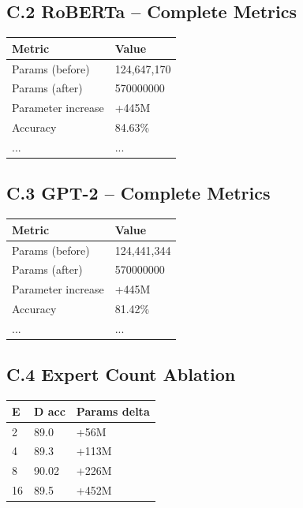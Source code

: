 \subsection{C.2 RoBERTa -- Complete Metrics}

\begin{table}[H]
\centering
\small
\begin{tabular}{ll}
\toprule
\textbf{Metric} & \textbf{Value} \\
\midrule
Params (before) & 124,647,170 \\
Params (after) & 570000000 \\
Parameter increase & +445M \\
Accuracy & 84.63\% \\
... & ... \\
\bottomrule
\end{tabular}
\end{table}

\subsection{C.3 GPT-2 -- Complete Metrics}

\begin{table}[H]
\centering
\small
\begin{tabular}{ll}
\toprule
\textbf{Metric} & \textbf{Value} \\
\midrule
Params (before) & 124,441,344 \\
Params (after) & 570000000 \\
Parameter increase & +445M \\
Accuracy & 81.42\% \\
... & ... \\
\bottomrule
\end{tabular}
\end{table}

\subsection{C.4 Expert Count Ablation}

\begin{table}[H]
\centering
\small
\begin{tabular}{lll}
\toprule
\textbf{E} & \textbf{D acc} & \textbf{Params delta} \\
\midrule
2 & 89.0 & +56M \\
4 & 89.3 & +113M \\
8 & 90.02 & +226M \\
16 & 89.5 & +452M \\
\bottomrule
\end{tabular}
\end{table}

